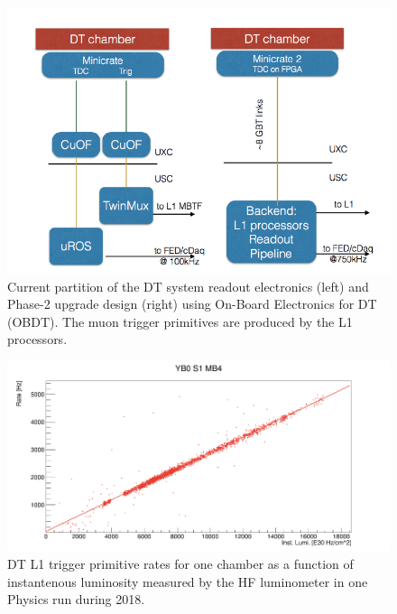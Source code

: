 \begin{figure}[hbtp]
\centering
\includegraphics[width=.8\linewidth]{tex/Part2/fig/DT/DT-DAQ-Phase1_vs_Phase2.png}
\caption{Current partition of the DT system readout electronics (left) and Phase-2 upgrade design (right) using On-Board Electronics for DT (OBDT).
  The muon trigger primitives are produced by the L1 processors.
}   
\label{fig:DT_DAQ2}
\end{figure}


\begin{figure}[hbtp]
\centering
\includegraphics[width=.8\linewidth]{tex/Part2/fig/DT/DT-Linearity.png}
\caption{DT L1 trigger primitive rates for one chamber  as a function of instantenous luminosity measured by the HF luminometer in one Physics run during 2018.} 
\label{fig:DT_linearity}
\end{figure}


